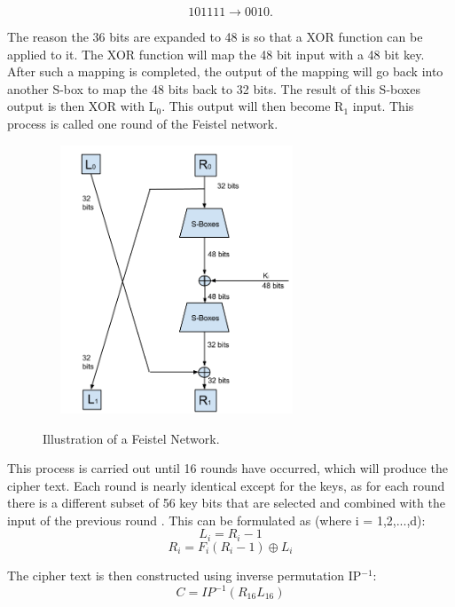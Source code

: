 \documentclass[11pt,a4paper, notitlepage]{report}
\begin{document}
\begin{displaymath}
101111 \rightarrow 0010.
\end{displaymath}

The reason the 36 bits are expanded to 48 is so that a XOR function can be applied to it. The XOR function will map the 48 bit input with a 48 bit key. After such a mapping is completed, the output of the mapping will go back into another S-box to map the 48 bits back to 32 bits. The result of this S-boxes output is then XOR with L$_{0}$. This output will then become R$_{1}$ input. This process is called one round of the Feistel network.
\begin{figure}[h]
\centering
\includegraphics[width=8cm, height=8cm]{FeistelNet.png}
\label{Fig: Feistel Network}
\caption{Illustration of a Feistel Network.}
\end{figure}

This process is carried out until 16 rounds have occurred, which will produce the cipher text. Each round is nearly identical except for the keys, as for each round there is a different subset of 56
key bits that are selected and combined with the input of the previous round \cite{Fabio2000LogicalSAT}.
This can be formulated as (where i = 1,2,...,d):
\begin{displaymath}
L_{i} = R_{i}-1
\end{displaymath}
\begin{displaymath}
R_{i} = F_{i} (R_{i}-1) \oplus L_{i}
\end{displaymath}

The cipher text is then constructed using inverse permutation IP$^{-1}$:
\begin{displaymath}
C = IP^{-1}(R_{16}L_{16})
\end{displaymath}
\end{document}
